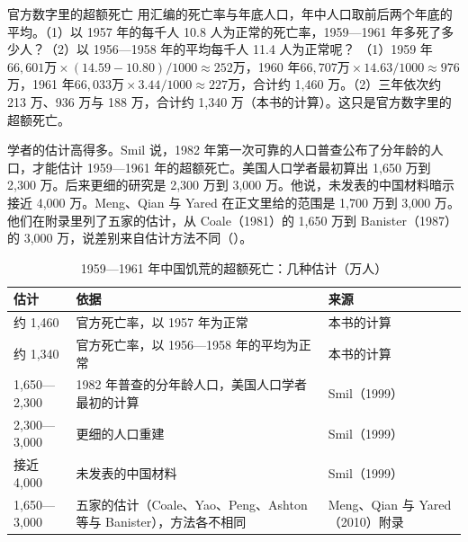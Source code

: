 \begin{example}{官方数字里的超额死亡}\label{ex:planned-excess}
用汇编的死亡率与年底人口，年中人口取前后两个年底的平均。（1）以 1957 年的每千人 10.8 人为正常的死亡率，1959—1961 年多死了多少人？（2）以 1956—1958 年的平均每千人 11.4 人为正常呢？
\solution
（1）1959 年$66{,}601\text{万}\times(14.59-10.80)/1000\approx252$万，1960 年$66{,}707\text{万}\times14.63/1000\approx976$万，1961 年$66{,}033\text{万}\times3.44/1000\approx227$万，合计约 1,460 万。（2）三年依次约 213 万、936 万与 188 万，合计约 1,340 万（本书的计算）。这只是官方数字里的超额死亡。
\end{example}

学者的估计高得多。Smil 说，1982 年第一次可靠的人口普查公布了分年龄的人口，才能估计 1959—1961 年的超额死亡\cite{smil1999}。美国人口学者最初算出 1,650 万到 2,300 万\cite{smil1999}。后来更细的研究是 2,300 万到 3,000 万\cite{smil1999}。他说，未发表的中国材料暗示接近 4,000 万\cite{smil1999}。Meng、Qian 与 Yared 在正文里给的范围是 1,700 万到 3,000 万\cite{mqy2010}。他们在附录里列了五家的估计，从 Coale（1981）的 1,650 万到 Banister（1987）的 3,000 万，说差别来自估计方法不同（）\cite{mqy2010}。

\begin{table}[tbp]
\centering\small
\caption{1959—1961 年中国饥荒的超额死亡：几种估计（万人）}\label{tab:planned-toll}
\begin{tabularx}{\linewidth}{@{}l Y l@{}}
\toprule
估计 & 依据 & 来源 \\
\midrule
约 1,460 & 官方死亡率，以 1957 年为正常 & 本书的计算 \\
约 1,340 & 官方死亡率，以 1956—1958 年的平均为正常 & 本书的计算 \\
1,650—2,300 & 1982 年普查的分年龄人口，美国人口学者最初的计算 & Smil（1999） \\
2,300—3,000 & 更细的人口重建 & Smil（1999） \\
接近 4,000 & 未发表的中国材料 & Smil（1999） \\
1,650—3,000 & 五家的估计（Coale、Yao、Peng、Ashton 等与 Banister），方法各不相同 & Meng、Qian 与 Yared（2010）附录 \\
\bottomrule
\end{tabularx}
\end{table}

